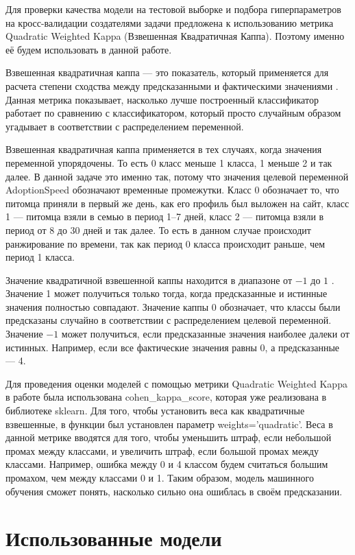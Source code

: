 \documentclass[14pt]{mmcs_article}
\begin{document}
Для проверки качества модели на тестовой выборке и подбора гиперпараметров на кросс-валидации создателями задачи предложена к использованию метрика Quadratic Weighted Kappa (Взвешенная Квадратичная Каппа). Поэтому именно её будем использовать в данной работе. 

Взвешенная квадратичная каппа --- это показатель, который применяется для расчета степени сходства между предсказанными и фактическими значениями \cite{lib:kappa1}. Данная метрика показывает, насколько лучше построенный классификатор работает по сравнению с классификатором, который просто случайным образом угадывает в соответствии с распределением переменной.

Взвешенная квадратичная каппа применяется в тех случаях, когда значения переменной упорядочены. То есть 0 класс меньше 1 класса, 1 меньше 2 и так далее. В данной задаче это именно так, потому что значения целевой переменной AdoptionSpeed обозначают временные промежутки. Класс 0 обозначает то, что питомца приняли в первый же день, как его профиль был выложен на сайт, класс 1 --- питомца взяли в семью в период 1--7 дней, класс 2 --- питомца взяли в период от 8 до 30 дней и так далее. То есть в данном случае происходит ранжирование по времени, так как период 0 класса происходит раньше, чем период 1 класса.

Значение квадратичной взвешенной каппы находится в диапазоне от $-1$ до $1$ \cite{lib:kappa2}. Значение 1 может получиться только тогда, когда предсказанные и истинные значения полностью совпадают. Значение каппы 0 обозначает, что классы были предсказаны случайно в соответствии с распределением целевой переменной. Значение $-1$ может получиться, если предсказанные значения наиболее далеки от истинных. Например, если все фактические значения равны 0, а предсказанные --- 4.

Для проведения оценки моделей с помощью метрики Quadratic Weighted Kappa в работе была использована cohen\_kappa\_score, которая уже реализована в библиотеке sklearn. Для того, чтобы установить веса как квадратичные взвешенные, в функции был установлен параметр weights='quadratic'. Веса в данной метрике вводятся для того, чтобы уменьшить штраф, если небольшой промах между классами, и увеличить штраф, если большой промах между классами. Например, ошибка между 0 и 4 классом будем считаться большим промахом, чем между классами 0 и 1. Таким образом, модель машинного обучения сможет понять, насколько сильно она ошиблась в своём предсказании.


\newpage
\section{Использованные модели}
\end{document}

